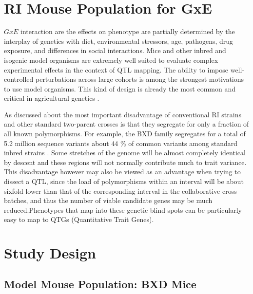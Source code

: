 \documentclass[a4paper,11pt,twoside]{book}
\begin{document}
	\section{RI Mouse Population for GxE}
	
	$GxE$ interaction are the effects on phenotype are partially determined by the interplay of genetics with diet, environmental stressors, age, pathogens, drug exposure, and differences in  social interactions. Mice and other inbred and isogenic model organisms are extremely well suited to evaluate complex experimental effects in the context of QTL mapping. The ability to impose well-controlled perturbations across large cohorts is among the strongest motivations to use model organisms. This kind of design is already the most common and critical in agricultural genetics \citep{Pregitzer2013GeneticLinkages.}. 
	
	As discussed about the most important disadvantage of conventional RI strains and other standard two-parent crosses is that they segregate for only a fraction of all known polymorphisms. For example, the BXD family segregates for a total of \~5.2 million sequence variants about 44 \% of common variants among standard inbred strains \citep{Wang2016JointRisk}. Some stretches of the genome will be almost completely identical by descent \citep{Wang2016JointRisk} and these regions will not normally contribute much to trait variance. This disadvantage however may also be viewed as an advantage when trying to dissect a QTL, since the load of polymorphisms within an interval will be about sixfold lower than that of the corresponding interval in the collaborative cross batches, and thus the number of viable candidate genes may be much reduced.Phenotypes that map into these genetic blind spots can be particularly easy to map to QTGs (Quantitative Trait Genes)\citep{Mackay2009TheProspects}. 
	
	\section{Study Design}
	
	\subsection{Model Mouse Population: BXD Mice}
	
\end{document}
